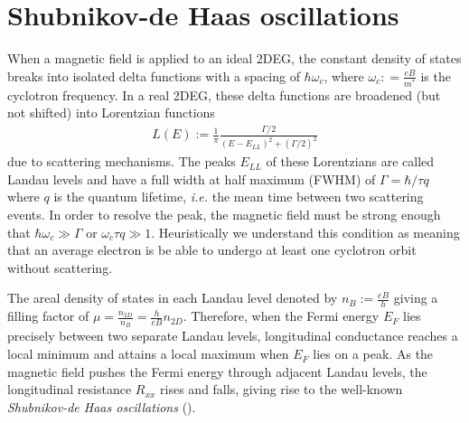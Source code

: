 \documentclass[12pt]{ruthesis}
\begin{document}
\section{Shubnikov-de Haas oscillations}\label{SdHO}
When a magnetic field is applied to an ideal 2DEG, the constant density of states breaks into isolated delta functions with a spacing of $\hbar\omega_{c}$, where $\omega_{c}: =\frac{eB}{m^{*}}$ is the cyclotron frequency.
In a real 2DEG, these delta functions are broadened (but not shifted) into Lorentzian functions
\begin{align}
L(E) := \frac{1}{\pi} \frac{\Gamma/2}{(E - E_{LL})^{2} + (\Gamma/2)^{2}}
\end{align}
due to scattering mechanisms.
The peaks $E_{LL}$ of these Lorentzians are called Landau levels and have a full width at half maximum (FWHM) of $\Gamma=\hbar/\tau q$ where $q$ is the quantum lifetime, \emph{i.e.\!} the mean time between two scattering events.
In order to resolve the peak, the magnetic field must be strong enough that $\hbar\omega_{c}\gg \Gamma$ or $\omega_{c}\tau q \gg 1$.
Heuristically we understand this condition as meaning that an average electron is be able to undergo at least one cyclotron orbit without scattering.

The areal density of states in each Landau level denoted by $n_{B} :=\frac{eB}{h}$ giving a filling factor of $\mu =\frac{n_{2D}}{n_{B}}=\frac{h}{eB}n_{2D}$.
Therefore, when the Fermi energy $E_{F}$ lies precisely between two separate Landau levels, longitudinal conductance reaches a local minimum and attains a local maximum when $E_{F}$ lies on a peak.
As the magnetic field pushes the Fermi energy through adjacent Landau levels, the longitudinal resistance $R_{xx}$ rises and falls, giving rise to the well-known \emph{Shubnikov-de Haas oscillations} ().
\end{document}

